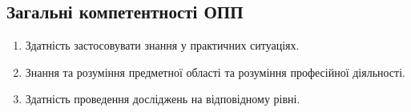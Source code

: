 \documentclass{Syllabus}
\begin{document}
\subsection*{Загальні компетентності ОПП}

\begin{enumerate}
	\item [ЗК 1:] Здатність застосовувати знання у практичних ситуаціях.
	\item [ЗК 2:] Знання та розуміння предметної області та розуміння професійної діяльності.
	\item [ЗК 6:] Здатність проведення досліджень на відповідному рівні.
\end{enumerate}
\end{document}
